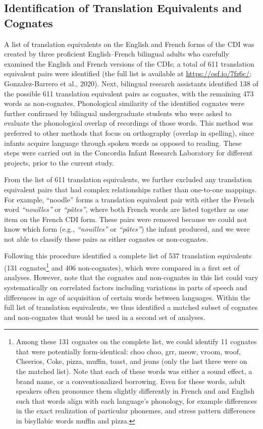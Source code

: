 \documentclass[
  ,man,floatsintext]{apa6}
\begin{document}
\hypertarget{identification-of-translation-equivalents-and-cognates}{%
\subsection{Identification of Translation Equivalents and Cognates}\label{identification-of-translation-equivalents-and-cognates}}

A list of translation equivalents on the English and French forms of the CDI was created by three proficient English--French bilingual adults who carefully examined the English and French versions of the CDIs; a total of 611 translation equivalent pairs were identified (the full list is available at \url{https://osf.io/7fz6c/}; Gonzalez-Barrero et al., 2020). Next, bilingual research assistants identified 138 of the possible 611 translation equivalent pairs as cognates, with the remaining 473 words as non-cognates. Phonological similarity of the identified cognates were further confirmed by bilingual undergraduate students who were asked to evaluate the phonological overlap of recordings of those words. This method was preferred to other methods that focus on orthography (overlap in spelling), since infants acquire language through spoken words as opposed to reading. These steps were carried out in the Concordia Infant Research Laboratory for different projects, prior to the current study.

From the list of 611 translation equivalents, we further excluded any translation equivalent pairs that had complex relationships rather than one-to-one mappings. For example, ``noodle'' forms a translation equivalent pair with either the French word \emph{``nouilles''} or \emph{``pâtes''}, where both French words are listed together as one item on the French CDI form. These pairs were removed because we could not know which form (e.g., \emph{``nouilles''} or \emph{``pâtes''}) the infant produced, and we were not able to classify these pairs as either cognates or non-cognates.

Following this procedure identified a complete list of 537 translation equivalents (131 cognates\footnote{Among these 131 cognates on the complete list, we could identify 11 cognates that were potentially form-identical: choo choo, grr, meow, vroom, woof, Cheerios, Coke, pizza, muffin, toast, and jeans (only the last three were on the matched list). Note that each of these words was either a sound effect, a brand name, or a conventionalized borrowing. Even for these words, adult speakers often pronounce them slightly differently in French and and English such that words align with each language's phonology, for example differences in the exact realization of particular phonemes, and stress pattern differences in bisyllabic words muffin and pizza.} and 406 non-cognates), which were compared in a first set of analyses. However, note that the cognates and non-cognates in this list could vary systematically on correlated factors including variations in parts of speech and differences in age of acquisition of certain words between languages. Within the full list of translation equivalents, we thus identified a matched subset of cognates and non-cognates that would be used in a second set of analyses.
\end{document}
